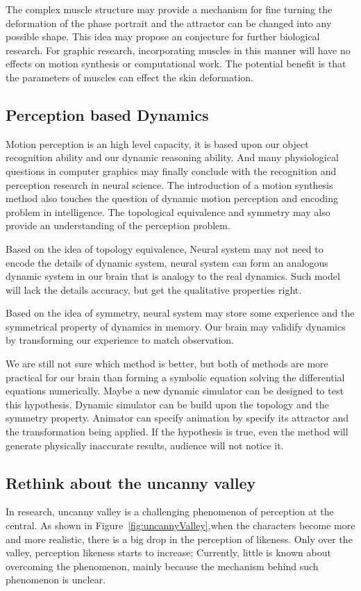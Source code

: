 The complex muscle structure may provide a mechanism for fine turning the deformation of the phase portrait and  the attractor can be changed into any possible shape.
This idea may propose an conjecture for further biological research.
For graphic research, incorporating muscles in this manner will have no effects on motion synthesis or computational work.
The potential benefit is that the parameters of muscles can effect the skin deformation.



\subsection{Perception based Dynamics}
Motion perception is an high level capacity, it is based upon our object recognition ability and our dynamic reasoning ability.
And many physiological questions in computer graphics may finally conclude with the recognition and perception research in neural science.
The introduction of a motion synthesis method also touches the question of dynamic motion perception and encoding problem in intelligence.
The topological equivalence and symmetry may also provide an understanding of the perception problem.

Based on the idea of topology equivalence,
Neural system may not need to encode the details of dynamic system, neural system can form an analogous dynamic system in our brain that is analogy to the real dynamics.
Such model will lack the details accuracy, but get the qualitative properties right.

Based on the idea of symmetry, neural system may store some experience and the symmetrical property of dynamics in memory.
Our brain may validify dynamics by transforming our experience to match observation.


We are still not sure which method is better, but both of methods are more practical for our brain than forming a symbolic equation solving the differential equations numerically.
Maybe a new dynamic simulator can be designed to test this hypothesis.
Dynamic simulator can be build upon the topology and the symmetry property.
Animator can specify animation by specify its attractor and the transformation being  applied.
If the hypothesis is true, even the method will generate physically inaccurate results, audience will not notice it.

\subsection{Rethink about the uncanny valley}
In \cms research, uncanny valley is a challenging phenomenon of perception at the  central. 
As shown in Figure~\ref{fig:uncannyValley},when the characters  become more and more realistic, there is a big drop in the perception of likeness.
Only over the valley, perception likeness starts to increase;
Currently, little is known about overcoming the phenomenon,
mainly because the mechanism behind such phenomenon is unclear.

